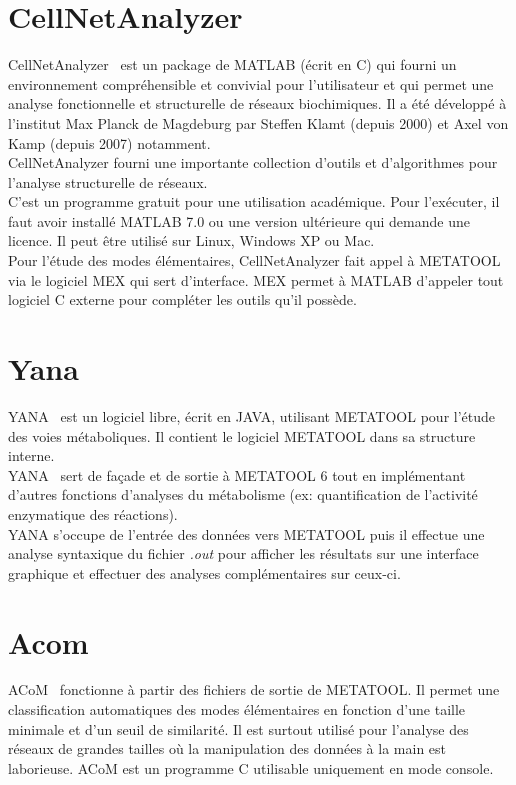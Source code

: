 \section{CellNetAnalyzer}
CellNetAnalyzer~\cite{cna:url} est un package de MATLAB (écrit en \textsc{C}) qui fourni un environnement compréhensible et convivial pour l'utilisateur et qui permet une analyse fonctionnelle et structurelle de réseaux biochimiques. Il a été développé à l'institut Max Planck de Magdeburg par Steffen Klamt (depuis 2000) et Axel von Kamp (depuis 2007) notamment.\\
CellNetAnalyzer fourni une importante collection d'outils et d'algorithmes pour l'analyse structurelle de réseaux.\\
C'est un programme gratuit pour une utilisation académique. Pour l'exécuter, il faut avoir installé MATLAB 7.0 ou une version ultérieure qui demande une licence. Il peut être utilisé sur Linux, Windows XP ou Mac.\\
Pour l'étude des modes élémentaires, CellNetAnalyzer fait appel à METATOOL via le logiciel MEX qui sert d'interface. MEX permet à MATLAB d'appeler tout logiciel \textsc{C} externe pour compléter les outils qu'il possède.

\section{Yana}
YANA~\cite{yana:url} est un logiciel libre, écrit en JAVA, utilisant METATOOL pour l'étude
des voies métaboliques. Il contient le logiciel METATOOL dans sa structure interne. \\
YANA~\cite{yanasq:url} sert de façade et de sortie à METATOOL 6 tout en implémentant d'autres fonctions d'analyses du métabolisme (ex: quantification de l'activité enzymatique des réactions).\\ YANA s'occupe de l'entrée des données vers METATOOL puis il effectue une analyse syntaxique du fichier \textit{.out} pour afficher les résultats sur une interface graphique et effectuer des analyses complémentaires sur ceux-ci.

\section{Acom}
ACoM~\cite{acom:url} fonctionne à partir des fichiers de sortie de METATOOL. Il permet une classification automatiques des modes élémentaires en fonction d'une taille minimale et d'un seuil de similarité. Il est surtout utilisé pour l'analyse des réseaux de grandes tailles où la manipulation des données à la main est laborieuse. ACoM est un programme
C utilisable uniquement en mode console.

